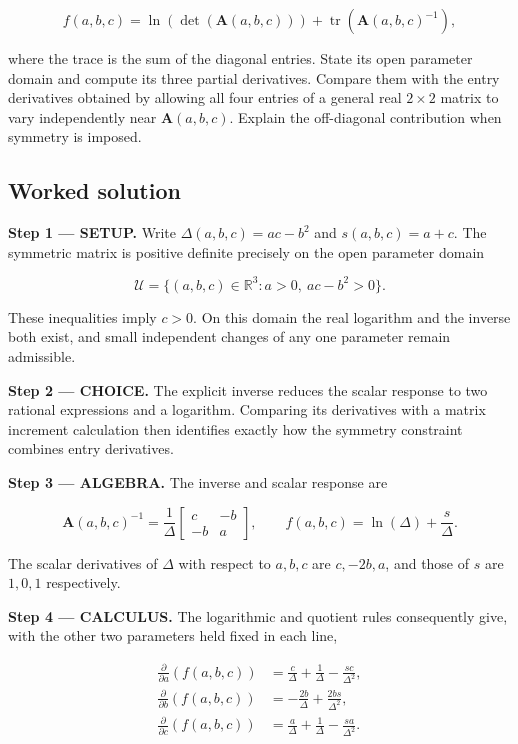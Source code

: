 \documentclass[11pt,oneside,openany]{book}
\begin{document}
\[
f(a,b,c)=\ln(\det(\mathbf A(a,b,c)))
+\operatorname{tr}(\mathbf A(a,b,c)^{-1}),
\]

where the trace is the sum of the diagonal entries. State its open parameter domain and compute its three partial derivatives. Compare them with the entry derivatives obtained by allowing all four entries of a general real \(2\times2\) matrix to vary independently near \(\mathbf A(a,b,c)\). Explain the off-diagonal contribution when symmetry is imposed.
\subsection*{Worked solution}

\textbf{Step 1 --- SETUP.} Write \(\Delta(a,b,c)=ac-b^2\) and \(s(a,b,c)=a+c\). The symmetric matrix is positive definite precisely on the open parameter domain

\[
\mathcal U=\{(a,b,c)\in\mathbb R^3:a>0,\ ac-b^2>0\}.
\]

These inequalities imply \(c>0\). On this domain the real logarithm and the inverse both exist, and small independent changes of any one parameter remain admissible.

\begin{ChoiceStep}
\textbf{Step 2 --- CHOICE.} The explicit inverse reduces the scalar response to two rational expressions and a logarithm. Comparing its derivatives with a matrix increment calculation then identifies exactly how the symmetry constraint combines entry derivatives.

\end{ChoiceStep}
\begingroup\color{AlgebraBlue}
\textbf{Step 3 --- ALGEBRA.} The inverse and scalar response are

\[
\mathbf A(a,b,c)^{-1}=\frac1\Delta\begin{bmatrix}c&-b\\-b&a\end{bmatrix},
\qquad
f(a,b,c)=\ln(\Delta)+\frac{s}{\Delta}.
\]

The scalar derivatives of \(\Delta\) with respect to \(a,b,c\) are \(c,-2b,a\), and those of \(s\) are \(1,0,1\) respectively.

\endgroup
\textbf{Step 4 --- CALCULUS.} The logarithmic and quotient rules consequently give, with the other two parameters held fixed in each line,

\[
\begin{aligned}
\frac{\partial}{\partial a}\left(f(a,b,c)\right)
&=\frac c\Delta+\frac1\Delta-\frac{sc}{\Delta^2},\\
\frac{\partial}{\partial b}\left(f(a,b,c)\right)
&=-\frac{2b}\Delta+\frac{2bs}{\Delta^2},\\
\frac{\partial}{\partial c}\left(f(a,b,c)\right)
&=\frac a\Delta+\frac1\Delta-\frac{sa}{\Delta^2}.
\end{aligned}
\]
\end{document}
